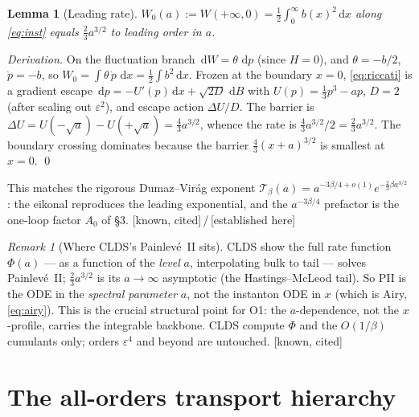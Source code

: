 \documentclass[11pt,reqno]{amsart}
\theoremstyle{plain}
\newtheorem{lemma}[proposition]{Lemma}
\theoremstyle{remark}
\newtheorem{remark}[proposition]{Remark}
\newcommand{\dd}{\,\mathrm{d}}
\newcommand{\eps}{\varepsilon}
\newcommand{\OK}{{\footnotesize\textsf{[established here]}}}
\newcommand{\cited}{{\footnotesize\textsf{[known, cited]}}}
\begin{document}
\begin{lemma}[Leading rate]\label{lem:rate}
$W_0(a):=W(+\infty,0)=\tfrac12\int_0^\infty b(x)^2\dd x$ along \eqref{eq:inst} equals
$\tfrac23a^{3/2}$ to leading order in $a$.
\end{lemma}

\emph{Derivation.} On the fluctuation branch $\dd W=\theta\,\dd p$ (since $H=0$), and
$\theta=-b/2$, $\dot p=-b$, so $W_0=\int\theta\,\dot p\,\dd x=\tfrac12\int b^2\dd x$. Frozen at the
boundary $x=0$, \eqref{eq:riccati} is a gradient escape $\dd p=-U'(p)\dd x+\sqrt{2D}\,\dd B$ with
$U(p)=\tfrac13p^3-ap$, $D=2$ (after scaling out $\eps^2$), and escape action
$\Delta U/D$. The barrier is $\Delta U=U(-\sqrt a)-U(+\sqrt a)=\tfrac43a^{3/2}$, whence the rate
is $\tfrac43a^{3/2}/2=\tfrac23a^{3/2}$. The boundary crossing dominates because the barrier
$\tfrac43(x+a)^{3/2}$ is smallest at $x=0$. \qed

This matches the rigorous Dumaz--Vir\'ag exponent $\mathcal T_\beta(a)=a^{-3\beta/4+o(1)}
e^{-\frac23\beta a^{3/2}}$ \cite{DV}: the eikonal reproduces the leading exponential, and the
$a^{-3\beta/4}$ prefactor is the one-loop factor $A_0$ of \S3. \cited\,/\,\OK

\begin{remark}[Where CLDS's Painlev\'e~II sits]\label{rem:pii}
CLDS \cite{CLDS} show the full rate function $\Phi(a)$ --- as a function of the \emph{level} $a$,
interpolating bulk to tail --- solves Painlev\'e~II; $\tfrac23a^{3/2}$ is its $a\to\infty$
asymptotic (the Hastings--McLeod tail). So PII is the ODE in the \emph{spectral parameter} $a$,
not the instanton ODE in $x$ (which is Airy, \eqref{eq:airy}). This is the crucial structural
point for O1: the $a$-dependence, not the $x$-profile, carries the integrable backbone. CLDS
compute $\Phi$ and the $O(1/\beta)$ cumulants only; orders $\eps^4$ and beyond are untouched.
\cited
\end{remark}

\section{The all-orders transport hierarchy}
\end{document}
